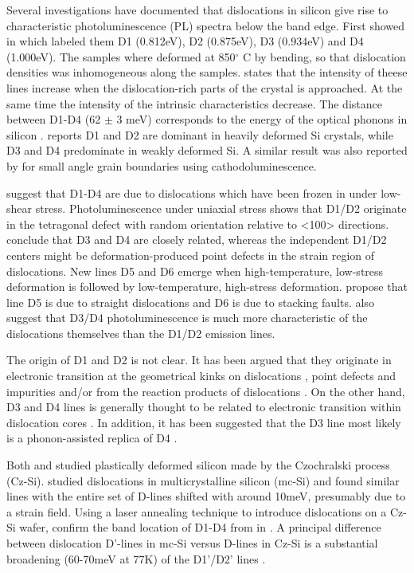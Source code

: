 Several investigations have documented that dislocations in silicon give rise to characteristic photoluminescence (PL) spectra below the band edge. First showed in \cite{drozdov76} which labeled them D1 (0.812eV), D2 (0.875eV), D3 (0.934eV) and D4 (1.000eV). The samples where deformed at 850$^\circ$ C by bending, so that dislocation densities was inhomogeneous along the samples. \cite{drozdov76} states that the intensity of theese lines increase when the dislocation-rich parts of the crystal is approached. At the same time the intensity of the intrinsic characteristics decrease. The distance between D1-D4 (62 $\pm$ 3 meV) corresponds to the energy of the optical phonons in silicon \cite{drozdov76}. \cite{drozdov76} reports D1 and D2 are dominant in heavily deformed Si crystals, while D3 and D4 predominate in weakly deformed Si. A similar result was also reported by \cite{lee09} for small angle grain boundaries using cathodoluminescence.

\cite{sauer85} suggest that D1-D4 are due to dislocations which have been frozen in under low-shear stress. Photoluminescence under uniaxial stress shows that D1/D2 originate in the tetragonal defect with random orientation relative to <100> directions. \cite{sauer85} conclude that D3 and D4 are closely related, whereas the independent D1/D2 centers might be deformation-produced point defects in the strain region of dislocations. New lines D5 and D6 emerge when high-temperature, low-stress deformation is followed by low-temperature, high-stress deformation. \cite{sauer85} propose that line D5 is due to straight dislocations and D6 is due to stacking faults. \cite{sauer85} also suggest that D3/D4 photoluminescence is much more characteristic of the dislocations themselves than the D1/D2 emission lines.


The origin of D1 and D2 is not clear. It has been argued that they originate in electronic transition at the geometrical kinks on dislocations \cite{suezawa83}, point defects \cite{sauer85} and impurities \cite{higgs91} and/or from the reaction products of dislocations \cite{sekiguchi95}. On the other hand, D3 and D4 lines is generally thought to be related to electronic transition within dislocation cores \cite{kveder95}. In addition, it has been suggested that the D3 line most likely is a phonon-assisted replica of D4 \cite{kveder95}.




Both \cite{drozdov76} and \cite{sauer85} studied plastically deformed silicon made by the Czochralski process (Cz-Si). \cite{tarasov00} studied  dislocations in multicrystalline silicon (mc-Si) and found similar lines with the entire set of D-lines shifted with around 10meV, presumably due to a strain field. Using a laser annealing technique \cite{staiger94} to introduce dislocations on a Cz-Si wafer, confirm the band location of D1-D4 from \cite{sauer85} in \cite{tarasov00}. A principal difference between dislocation D'-lines in mc-Si versus D-lines in Cz-Si is a substantial broadening (60-70meV at 77K) of the D1'/D2' lines \cite{tarasov00}.


